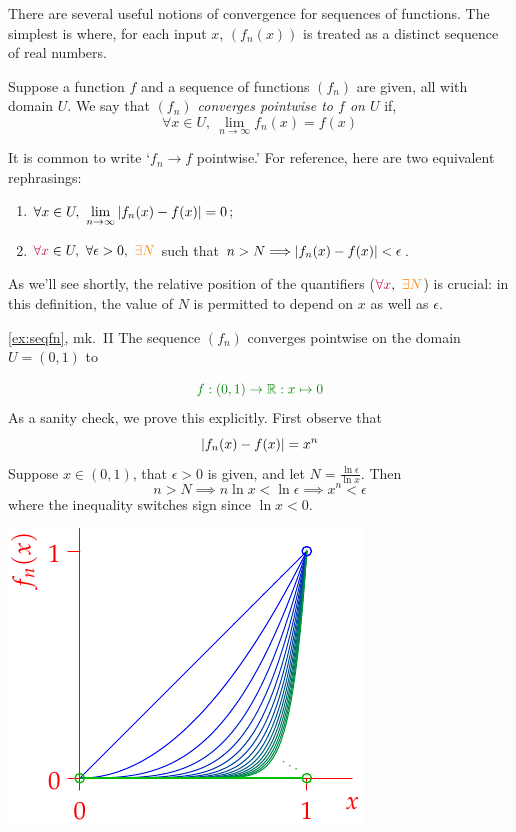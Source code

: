 There are several useful notions of convergence for sequences of functions. The simplest is where, for each input $x$, $(f_n(x))$ is treated as a distinct sequence of real numbers.

\begin{defn}{}{}
	Suppose a function $f$ and a sequence of functions $(f_n)$ are given, all with domain $U$. We say that \emph{$(f_n)$ converges pointwise to $f$ on $U$} if,
	\[
		\forall x\in U,\ \lim\limits_{n\to\infty}f_n(x)=f(x)
	\]
\end{defn}

It is common to write `$f_n\to f$ pointwise.' For reference, here are two equivalent rephrasings:
\begin{enumerate}
  \item $\displaystyle \forall x\in U, \ \lim_{n\to\infty}\nm{f_n(x)-f(x)}=0$;
  \item $\textcolor{purple}{\forall x}\in U,\ \forall \epsilon>0,\ \textcolor{orange}{\exists N}$ such that $n>N\Longrightarrow \left| f_n(x)-f(x)\right|<\epsilon$.
\end{enumerate}

As we'll see shortly, the relative position of the quantifiers ($\textcolor{purple}{\forall x}, \ \textcolor{orange}{\exists N}$) is crucial: in this definition, the value of $N$ is permitted to depend on $x$ as well as $\epsilon$.
\vspace*{10pt}


\begin{example*}{\ref{ex:seqfn}, mk.\ II}{}
	The sequence $(f_n)$ converges pointwise on the domain $U=(0,1)$ to\smallbreak
	\begin{minipage}[t]{0.6\linewidth}\vspace{-12pt}
	\[
		\textcolor{Green}{f:(0,1)\to\R:x\mapsto 0}
	\]
	As a sanity check, we prove this explicitly. First observe that
	\[
		\left| f_n(x)-f(x)\right|=x^n
	\]
	Suppose $x\in(0,1)$, that $\epsilon>0$ is given, and let $N=\frac{\ln\epsilon}{\ln x}$. Then
	\[
		n>N\implies n\ln x<\ln\epsilon\implies x^n<\epsilon
	\]
	where the inequality switches sign since $\ln x<0$.
	\end{minipage}
	\hfill
	\begin{minipage}[t]{0.39\linewidth}\vspace{0pt}
		\flushright\includegraphics[scale=0.95]{seqex2}
	\end{minipage}
\end{example*}

